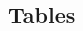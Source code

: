 \documentclass[12pt]{article}
\begin{document}
\begin{spacing}{2.0}



     

\clearpage
\end{spacing}

\begin{landscape}
\section*{Tables}


\end{landscape}
\end{document}
